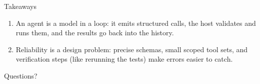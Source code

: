 \documentclass[aspectratio=169,14pt]{beamer}
\begin{document}
\begin{frame}{Takeaways}
  \begin{enumerate}
    \item An agent is a model in a loop: it emits structured calls, the host validates and runs them, and the results go back into the history.
    \item Reliability is a design problem: precise schemas, small scoped tool sets, and verification steps (like rerunning the tests) make errors easier to catch.
  \end{enumerate}
\end{frame}

\begin{frame}[standout]
  Questions?
\end{frame}
\end{document}
